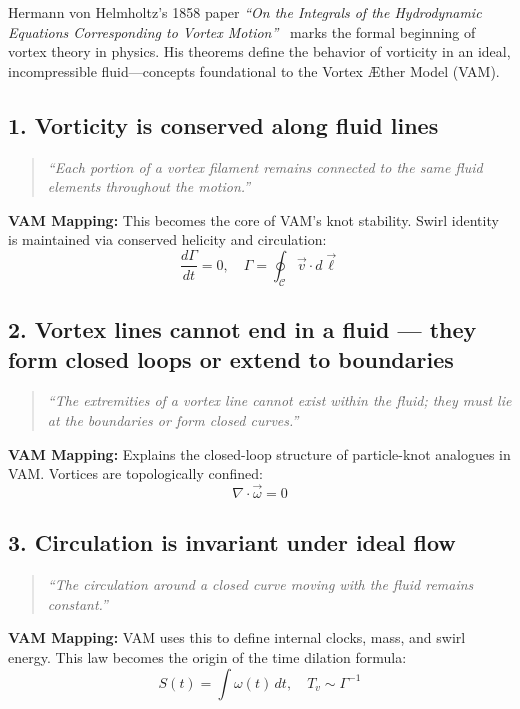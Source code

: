     Hermann von Helmholtz’s 1858 paper \textit{“On the Integrals of the Hydrodynamic Equations Corresponding to Vortex Motion”}~\cite{helmholtz1858vortices} marks the formal beginning of vortex theory in physics. His theorems define the behavior of vorticity in an ideal, incompressible fluid—concepts foundational to the Vortex Æther Model (VAM).

    \subsection*{1. Vorticity is conserved along fluid lines}
    \begin{quote}
    \textit{“Each portion of a vortex filament remains connected to the same fluid elements throughout the motion.”}
    \end{quote}

    \textbf{VAM Mapping:} This becomes the core of VAM’s knot stability. Swirl identity is maintained via conserved helicity and circulation:
    \[
    \frac{d\Gamma}{dt} = 0, \quad \Gamma = \oint_{\mathcal{C}} \vec{v} \cdot d\vec{\ell}
    \]

    \subsection*{2. Vortex lines cannot end in a fluid — they form closed loops or extend to boundaries}
    \begin{quote}
    \textit{“The extremities of a vortex line cannot exist within the fluid; they must lie at the boundaries or form closed curves.”}
    \end{quote}

    \textbf{VAM Mapping:} Explains the closed-loop structure of particle-knot analogues in VAM. Vortices are topologically confined:
    \[
    \nabla \cdot \vec{\omega} = 0
    \]

    \subsection*{3. Circulation is invariant under ideal flow}
    \begin{quote}
    \textit{“The circulation around a closed curve moving with the fluid remains constant.”}
    \end{quote}

    \textbf{VAM Mapping:} VAM uses this to define internal clocks, mass, and swirl energy. This law becomes the origin of the time dilation formula:
    \[
    S(t) = \int \omega(t) \, dt, \quad T_v \sim \Gamma^{-1}
    \]


